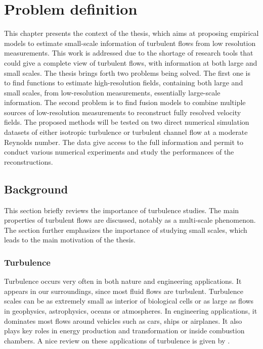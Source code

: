 \chapter{Problem definition} 
\label{chap_problem_definition}
This chapter presents the context of the thesis, which aims at proposing empirical models to estimate small-scale information of turbulent flows from low resolution measurements. This work is addressed due to the shortage of research tools that could give a complete view of turbulent flows, with information at both large and small scales. The thesis brings forth two problems being solved. The first one is to find functions to estimate high-resolution fields, containing both large and small scales, from low-resolution measurements, essentially large-scale information. The second problem is to find fusion models to combine multiple sources of low-resolution measurements to reconstruct fully resolved velocity fields. The proposed methods will be tested on two direct numerical simulation datasets of either isotropic turbulence or turbulent channel flow at a moderate Reynolds number. The data give access to the full information and permit to conduct various numerical experiments and study the performances of the reconstructions.

\section{Background}
This section briefly reviews the importance of turbulence studies. The main properties of turbulent flows are discussed, notably as a multi-scale phenomenon. The section further emphasizes the importance of studying small scales, which leads to the main motivation of the thesis. 

\subsection{Turbulence}
Turbulence occurs very often in both nature and engineering applications. It appears in our surroundings, since most fluid flows are turbulent. Turbulence scales can be as extremely small as interior of biological cells or as large as flows in geophysics, astrophysics, oceans or atmospheres. In engineering applications, it dominates most flows around vehicles such as cars, ships or airplanes. It also plays key roles in energy production and transformation or inside combustion chambers. A nice review on these applications of turbulence is given by \citet{tennekes1972first, mcdonough2004introductory, george2009lectures}.

